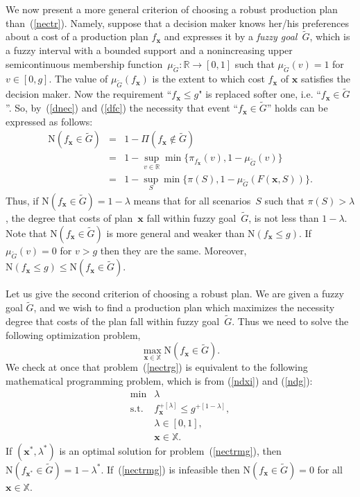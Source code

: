\documentclass[11pt]{article}
\newcommand{\Rset}{\mathbb{R}}
\newcommand{\Xset}{\mathbb{X}}
\begin{document}
We now present a more general criterion of choosing a robust production plan than~(\ref{nectr}). Namely,
suppose that a decision maker knows her/his preferences about  
a cost of a production plan
$f_{\pmb{x}}$ and expresses it by
a \emph{fuzzy goal}~$\widetilde{G}$, which is a fuzzy interval with a bounded support
and a nonincreasing  upper 
semicontinuous membership function~$\mu_{\widetilde{G}}:\Rset\rightarrow [0,1]$
such that $\mu_{\widetilde{G}}(v)=1$
for $v\in [0,g]$.
The value of $\mu_{\widetilde{G}}(f_{\pmb{x}})$ is  the extent to which
cost $f_{\pmb{x}}$ of $\pmb{x}$ satisfies the decision maker.
Now the requirement ``$f_{\pmb{x}}\leq g$"  is replaced softer one, i.e. ``$f_{\pmb{x}}\in \widetilde{G}$''. 
So, by~(\ref{dnec}) and (\ref{dfc})
the necessity that event ``$f_{\pmb{x}}\in \widetilde{G}$'' holds can be expressed  as follows:
\begin{eqnarray}
\mathrm{N}(f_{\pmb{x}}\in \widetilde{G})
&=&1-\Pi(f_{\pmb{x}}\not\in \widetilde{G})\label{ndg}\\
&=&
1-\sup_{v\in \Rset}\min\{\pi_{f_{\pmb{x}}}(v),1-\mu_{\widetilde{G}}(v)\}\nonumber\\
&=&1-\sup_{S}\min\{\pi(S),1-\mu_{\widetilde{G}}(F(\pmb{x},S))\}.\nonumber
\end{eqnarray}
Thus, if $\mathrm{N}(f_{\pmb{x}}\in \widetilde{G})=1-\lambda$
means that for all scenarios~$S$
such that $\pi(S)>\lambda$, 
the degree that costs of plan~$\pmb{x}$ fall within 
fuzzy goal~$\widetilde{G}$,
is not less than $1-\lambda$. Note that $\mathrm{N}(f_{\pmb{x}}\in \widetilde{G})$
is more general  and weaker than $\mathrm{N}(f_{\pmb{x}}\leq g)$. If 
 $\mu_{\widetilde{G}}(v)=0$ for $v>g$ then they are the same. Moreover,
  $\mathrm{N}(f_{\pmb{x}}\leq g)\leq \mathrm{N}(f_{\pmb{x}}\in \widetilde{G})$.
 
Let us give the second criterion of choosing a robust plan.
We are given a fuzzy goal $\widetilde{G}$, and we wish to find a production plan
which maximizes the necessity degree that costs of the plan fall within 
fuzzy goal~$\widetilde{G}$. Thus we need to solve the following optimization problem,
\begin{equation}
	\label{nectrg}
	\max_{\pmb{x}\in \Xset}\mathrm{N}(f_{\pmb{x}}\in \widetilde{G}).
\end{equation}
We check at once that problem~(\ref{nectrg}) 
 is equivalent to the following 
mathematical programming problem, which is from (\ref{ndxi}) and (\ref{ndg}):
\begin{equation}
 \begin{array}{ll}
 \min &\lambda\\
 \text{s.t.} & f^{+[\lambda]}_{\pmb{x}}\leq 
   g^{+[1-\lambda]},\\
       &\lambda\in [0,1],\\
       & \pmb{x}\in \Xset.
 \end{array}
 \label{nectrmg}
\end{equation}
If $(\pmb{x}^{*},\lambda^{*})$ is an optimal solution
for problem~(\ref{nectrmg}), then $\mathrm{N}(f_{\pmb{x}^{*}}\in \widetilde{G})=1-\lambda^{*}$.
 If~(\ref{nectrmg}) is
infeasible then 
$\mathrm{N}(f_{\pmb{x}}\in \widetilde{G})=0$ for all $\pmb{x}\in \Xset$. 
\end{document}
